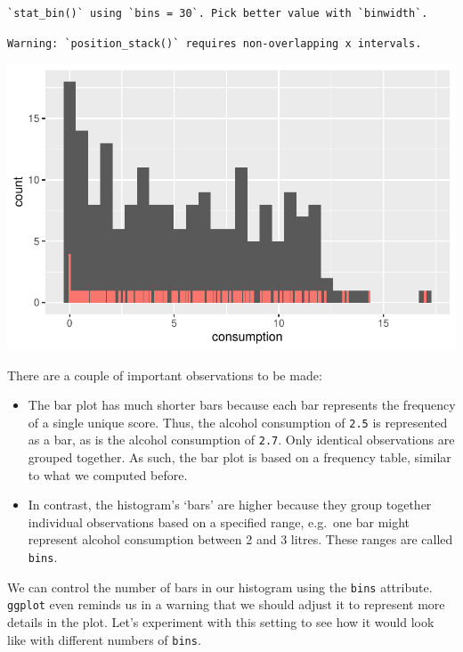 \documentclass[
  letterpaper,
]{krantz}
\begin{document}
\begin{verbatim}
`stat_bin()` using `bins = 30`. Pick better value with `binwidth`.
\end{verbatim}

\begin{verbatim}
Warning: `position_stack()` requires non-overlapping x intervals.
\end{verbatim}

\includegraphics{08_descriptive_statistics_files/figure-pdf/histogram-vs-barplot-1.pdf}

There are a couple of important observations to be made:

\begin{itemize}
\item
  The bar plot has much shorter bars because each bar represents the
  frequency of a single unique score. Thus, the alcohol consumption of
  \texttt{2.5} is represented as a bar, as is the alcohol consumption of
  \texttt{2.7}. Only identical observations are grouped together. As
  such, the bar plot is based on a frequency table, similar to what we
  computed before.
\item
  In contrast, the histogram's `bars' are higher because they group
  together individual observations based on a specified range, e.g.~one
  bar might represent alcohol consumption between 2 and 3 litres. These
  ranges are called \texttt{bins}.
\end{itemize}

We can control the number of bars in our histogram using the
\texttt{bins} attribute. \texttt{ggplot} even reminds us in a warning
that we should adjust it to represent more details in the plot. Let's
experiment with this setting to see how it would look like with
different numbers of \texttt{bins}.
\end{document}
